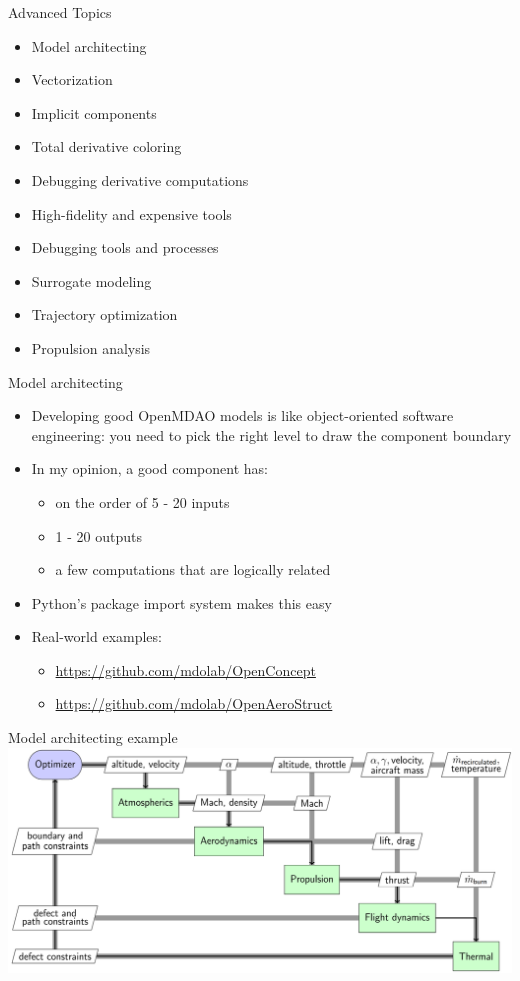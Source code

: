 \documentclass[aspectratio=169, usenames,dvipsnames, 14pt]{beamer}
\begin{document}
\begin{frame}{Advanced Topics}
	\begin{itemize}
		\item Model architecting
		\item Vectorization
		\item Implicit components
		\item Total derivative coloring
		\item Debugging derivative computations
		\item High-fidelity and expensive tools
		\item Debugging tools and processes
		\item Surrogate modeling
		\item Trajectory optimization
		\item Propulsion analysis
	\end{itemize}
\end{frame}

\begin{frame}{Model architecting}
	\begin{itemize}
		\item Developing good OpenMDAO models is like object-oriented software engineering: you need to pick the right level to draw 				the component boundary
		\item In my opinion, a good component has:
			\begin{itemize}
				\item on the order of 5 - 20 inputs
				\item 1 - 20 outputs
				\item a few computations that are logically related
			\end{itemize}
		\item Python's package import system makes this easy
		\item Real-world examples:
			\begin{itemize}
				\item \url{https://github.com/mdolab/OpenConcept}
				\item \url{https://github.com/mdolab/OpenAeroStruct}
			\end{itemize}
	\end{itemize}
\end{frame}

\begin{frame}{Model architecting example}
	\includegraphics[scale=.49]{images/slide_115.png}
\end{frame}
\end{document}
